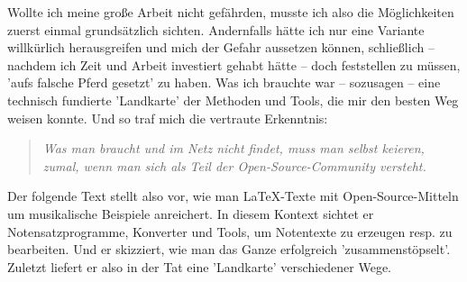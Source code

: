 Wollte ich meine große Arbeit nicht gefährden, musste ich also die Möglichkeiten
zuerst einmal grundsätzlich sichten. Andernfalls hätte ich nur eine Variante
willkürlich herausgreifen und mich der Gefahr aussetzen können, schließlich --
nachdem ich Zeit und Arbeit investiert gehabt hätte -- doch feststellen zu
müssen, 'aufs falsche Pferd gesetzt' zu haben. Was ich brauchte war -- sozusagen
-- eine technisch fundierte 'Landkarte' der Methoden und Tools, die mir den
besten Weg weisen konnte. Und so traf mich die vertraute Erkenntnis:

\begin{quote}\textit{Was man braucht und im Netz nicht findet, muss man selbst
keieren, zumal, wenn man sich als Teil der Open-Source-Community versteht.}
\end{quote}

Der folgende Text stellt also vor, wie man \LaTeX-Texte mit Open-Source-Mitteln
um musikalische Beispiele anreichert. In diesem Kontext sichtet er
Notensatzprogramme, Konverter und Tools, um Notentexte zu erzeugen resp.
zu bearbeiten. Und er skizziert, wie man das Ganze erfolgreich
'zusammenstöpselt'. Zuletzt liefert er also in der Tat eine 'Landkarte' 
verschiedener Wege.

%
